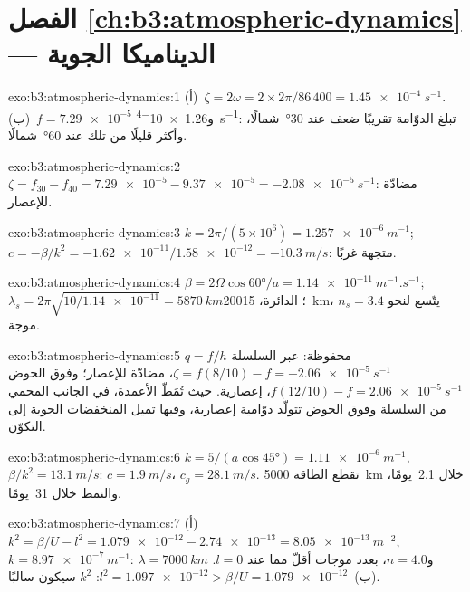 \section*{الفصل \ref{ch:b3:atmospheric-dynamics} --- الديناميكا الجوية}

\begin{solution}{exo:b3:atmospheric-dynamics:1}
(أ)~$\zeta = 2\omega = 2\times2\pi/86\,400 = \qty{1.45e-4}{s^{-1}}$.
(ب)~$f = \num{7.29e-5}$ و\qty{1.26e-4}{s^{-1}}: تبلغ الدوّامة تقريبًا
ضعف  عند \ang{30}~شمالًا، وأكثر قليلًا من
تلك عند \ang{60}~شمالًا.
\end{solution}

\begin{solution}{exo:b3:atmospheric-dynamics:2}
$\zeta = f_{30} - f_{40} = \num{7.29e-5} - \num{9.37e-5} =
\qty{-2.08e-5}{s^{-1}}$: مضادّة للإعصار.
\end{solution}

\begin{solution}{exo:b3:atmospheric-dynamics:3}
$k = 2\pi/(5\times10^6) = \qty{1.257e-6}{m^{-1}}$; $c = -\beta/k^2 =
-\num{1.62e-11}/\num{1.58e-12} = \qty{-10.3}{m/s}$: متجهة غربًا.
\end{solution}

\begin{solution}{exo:b3:atmospheric-dynamics:4}
$\beta = 2\Omega\cos\ang{60}/a = \qty{1.14e-11}{m^{-1}.s^{-1}}$;
$\lambda_s = 2\pi\sqrt{10/\num{1.14e-11}} = \qty{5870}{km}$؛ الدائرة،
\qty{20015}{km}، يتّسع لنحو $n_s = 3.4$ موجة.
\end{solution}

\begin{solution}{exo:b3:atmospheric-dynamics:5}
$q = f/h$ محفوظة: عبر السلسلة $\zeta = f(8/10) - f =
\qty{-2.06e-5}{s^{-1}}$، مضادّة للإعصار؛ وفوق الحوض $f(12/10) - f =
\qty{+2.06e-5}{s^{-1}}$، إعصارية. حيث تُمَطّ الأعمدة، في الجانب المحمي
من السلسلة وفوق الحوض تتولّد دوّامية إعصارية، وفيها
تميل المنخفضات الجوية إلى التكوّن.
\end{solution}

\begin{solution}{exo:b3:atmospheric-dynamics:6}
$k = 5/(a\cos\ang{45}) = \qty{1.11e-6}{m^{-1}}$, $\beta/k^2 =
\qty{13.1}{m/s}$: $c = \qty{1.9}{m/s}$، $c_g = \qty{28.1}{m/s}$. تقطع الطاقة
\qty{5000}{km} خلال \num{2.1}~يومًا، والنمط خلال \num{31}~يومًا.
\end{solution}

\begin{solution}{exo:b3:atmospheric-dynamics:7}
(أ)~$k^2 = \beta/U - l^2 = \num{1.079e-12} - \num{2.74e-13} =
\qty{8.05e-13}{m^{-2}}$, $k = \qty{8.97e-7}{m^{-1}}$: $\lambda =
\qty{7000}{km}$ و$n = 4.0$، بعدد موجات أقلّ مما عند $l = 0$. (ب)~$l^2 =
\num{1.097e-12} > \beta/U = \num{1.079e-12}$: $k^2$ سيكون سالبًا.
\end{solution}

